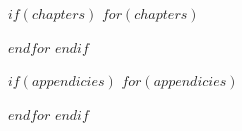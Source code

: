 \documentclass[12pt,a4paper,twoside,openright]{report}
\let\openright=\cleardoublepage
\begin{document}


\tableofcontents

$if(chapters)$
$for(chapters)$

$endfor$
$endif$



$if(appendicies)$
\appendix
$for(appendicies)$

$endfor$
$endif$

\openright
\end{document}
